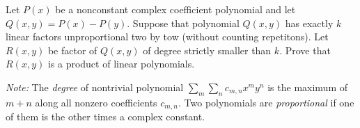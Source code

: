 Let $P(x)$ be a nonconstant complex coefficient polynomial and let $Q(x,y)=P(x)-P(y).$ Suppose that polynomial $Q(x,y)$ has exactly $k$ linear factors unproportional two by tow (without counting repetitons). Let $R(x,y)$ be factor of $Q(x,y)$ of degree strictly smaller than $k$. Prove that $R(x,y)$ is a product of linear polynomials.

\textit{Note: } The \textit{degree} of nontrivial polynomial $\sum_{m}\sum_{n}c_{m,n}x^{m}y^{n}$ is the maximum of $m+n$ along all nonzero coefficients $c_{m,n}.$ Two polynomials are \textit{proportional} if one of them is the other times a complex constant.



